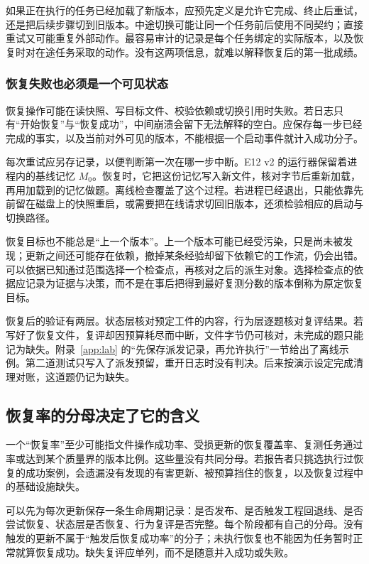 如果正在执行的任务已经加载了新版本，应预先定义是允许它完成、终止后重试，还是把后续步骤切到旧版本。中途切换可能让同一个任务前后使用不同契约；直接重试又可能重复外部动作。最容易审计的记录是每个任务绑定的实际版本，以及恢复时对在途任务采取的动作。没有这两项信息，就难以解释恢复后的第一批成绩。

\subsubsection{恢复失败也必须是一个可见状态}

恢复操作可能在读快照、写目标文件、校验依赖或切换引用时失败。若日志只有“开始恢复”与“恢复成功”，中间崩溃会留下无法解释的空白。应保存每一步已经完成的事实，以及当前对外可见的版本，不能根据一个启动事件就计入成功分子。

每次重试应另存记录，以便判断第一次在哪一步中断。E12 v2 的运行器保留着进程内的基线记忆 $M_0$。恢复时，它把这份记忆写入新文件，核对字节后重新加载，再用加载到的记忆做题。离线检查覆盖了这个过程。若进程已经退出，只能依靠先前留在磁盘上的快照重启，或需要把在线请求切回旧版本，还须检验相应的启动与切换路径。

恢复目标也不能总是“上一个版本”。上一个版本可能已经受污染，只是尚未被发现；更新之间还可能存在依赖，撤掉某条经验却留下依赖它的工作流，仍会出错。可以依据已知通过范围选择一个检查点，再核对之后的派生对象。选择检查点的依据应记录为证据与决策，而不是在事后把得到最好复测分数的版本倒称为原定恢复目标。

恢复后的验证有两层。状态层核对预定工件的内容，行为层逐题核对复评结果。若写好了恢复文件，复评却因预算耗尽而中断，文件字节仍可核对，未完成的题只能记为缺失。附录~\ref{app:lab} 的“先保存派发记录，再允许执行”一节给出了离线示例。第二道测试只写入了派发预留，重开日志时没有判决。后来按演示设定完成清理对账，这道题仍记为缺失。

\subsection{恢复率的分母决定了它的含义}
\label{sec:ch14-recovery-denominator}

一个“恢复率”至少可能指文件操作成功率、受损更新的恢复覆盖率、复测任务通过率或达到某个质量界的版本比例。这些量没有共同分母。若报告者只挑选执行过恢复的成功案例，会遗漏没有发现的有害更新、被预算挡住的恢复，以及恢复过程中的基础设施缺失。

可以先为每次更新保存一条生命周期记录：是否发布、是否触发工程回退线、是否尝试恢复、状态层是否恢复、行为复评是否完整。每个阶段都有自己的分母。没有触发的更新不属于“触发后恢复成功率”的分子；未执行恢复也不能因为任务暂时正常就算恢复成功。缺失复评应单列，而不是随意并入成功或失败。

